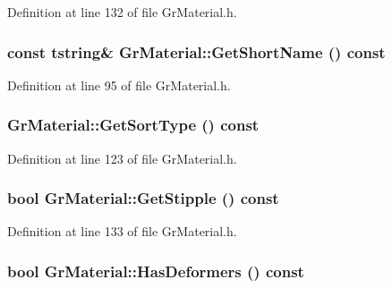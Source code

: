 \begin{CompactItemize}
Definition at line 132 of file GrMaterial.h.\hypertarget{class_gr_material_b90ae0e999f14823f9aeebd447a52fd8}{
\subsubsection[{GetShortName}]{\setlength{\rightskip}{0pt plus 5cm}const {\bf tstring}\& GrMaterial::GetShortName () const}}
\label{class_gr_material_b90ae0e999f14823f9aeebd447a52fd8}




Definition at line 95 of file GrMaterial.h.\hypertarget{class_gr_material_2ead7b081144beb220be74c2516d9832}{
\subsubsection[{GetSortType}]{ GrMaterial::GetSortType () const}}
\label{class_gr_material_2ead7b081144beb220be74c2516d9832}




Definition at line 123 of file GrMaterial.h.\hypertarget{class_gr_material_1a03f69a955aaf5d8a2c6094685a710a}{
\subsubsection[{GetStipple}]{\setlength{\rightskip}{0pt plus 5cm}bool GrMaterial::GetStipple () const}}
\label{class_gr_material_1a03f69a955aaf5d8a2c6094685a710a}




Definition at line 133 of file GrMaterial.h.\hypertarget{class_gr_material_209457388b0f29c4d36089d6c3bffd3a}{
\subsubsection[{HasDeformers}]{\setlength{\rightskip}{0pt plus 5cm}bool GrMaterial::HasDeformers () const}}
\label{class_gr_material_209457388b0f29c4d36089d6c3bffd3a}





\end{CompactItemize}
